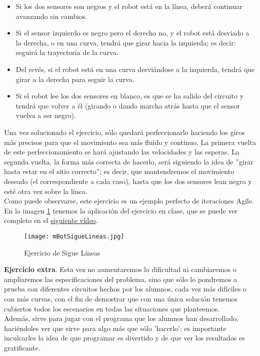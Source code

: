 \begin{description}
\begin{itemize}
	\item Si los dos sensores son negros y el robot está en la línea, deberá continuar avanzando sin cambios.
	\item Si el sensor izquierdo es negro pero el derecho no, y el robot está desviado a la derecha, o en una curva, tendrá que girar hacia la izquierda; es decir: seguirá la trayectoria de la curva.
	\item Del revés, si el robot está en una curva desviándose a la izquierda, tendrá que girar a la derecha para seguir la curva.
	\item Si el robot lee los dos sensores en blanco, es que se ha salido del circuito y tendrá que volver a él (girando o dando marcha atrás hasta que el sensor vuelva a ser negro).
\end{itemize}
Una vez solucionado el ejercicio, sólo quedará perfeccionarlo haciendo los giros más precisos para que el movimiento sea más fluido y continuo. La primera vuelta de este perfeccionamiento se hará ajustando las velocidades y las esperas. La segunda vuelta, la forma más correcta de hacerlo, será siguiendo la idea de ''girar hasta estar en el sitio correcto''; es decir, que mantendremos el movimiento deseado (el correspondiente a cada caso), hasta que los dos sensores lean negro y esté otra vez sobre la línea.\\
Como puede observarse, este ejercicio es un ejemplo perfecto de iteraciones Agile.
En la imagen \ref{img:mBotSigueLineas} tenemos la aplicación del ejercicio en clase, que se puede ver completo en el \href{https://www.youtube.com/watch?v=Bvspt7w086E}{siguiente vídeo}.
\begin{figure}[H]
	\texttt{[image: mBotSigueLineas.jpg]}
	\centering	
	\caption{Ejercicio de Sigue Líneas}
	\label{img:mBotSigueLineas}
\end{figure}

\textbf{Ejercicio extra}. Esta vez no aumentaremos la dificultad ni cambiaremos o ampliaremos las especificaciones del problema, sino que sólo lo pondremos a prueba con diferentes circuitos hechos por los alumnos, cada vez más difíciles o con más curvas, con el fin de demostrar que con una única solución tenemos cubiertos todos los escenarios en todas las situaciones que planteemos. \\
Además, sirve para jugar con el programa que los alumnos han desarrollado, haciéndoles ver que sirve para algo más que sólo 'hacerlo'; es importante inculcarles la idea de que programar es divertido y de que ver los resultados es gratificante.


\end{description}
